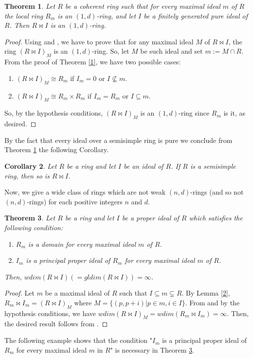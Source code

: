 \documentclass{amsart}
\newtheorem{theorem}{Theorem}[section]
\newtheorem{corollary}[theorem]{Corollary}
\theoremstyle{definition}
\theoremstyle{remark}
\theoremstyle{Definition and Notation}
\begin{document}
\begin{theorem}\label{20}Let $R$ be a coherent ring such that for every maximal ideal $m$ of $R$
the local ring $R_{m}$ is an $(1,d)$-ring, and let  $I$ be a
finitely generated pure ideal of $R$. Then $R\bowtie I$ is an
$(1,d)$-ring.
\end{theorem}
\begin{proof}
Using \cite[Theorem 3.2]{C} and \cite[Theorem 3.1]{CM}, we have to
prove that for any maximal ideal $M$ of $R\bowtie I$, the ring
$(R\bowtie I)_M$ is an $(1,d)$-ring. So, let $M$ be such ideal and
set $m:=M\cap R$. From the proof of Theorem \ref{1}, we have two
possible cases:

\begin{enumerate}
    \item $(R\bowtie I)_{M}\cong R_{m}$ if $I_m=0$ or $I\nsubseteq
    m$.
    \item $(R\bowtie I)_{M} \cong R_{m}\times R_m$ if $I_m=R_m$ or
    $I\subseteq m$.
\end{enumerate}
So, by the hypothesis conditions, $(R\bowtie I)_M$ is an
$(1,d)$-ring since $R_m$ is it, as desired.
\end{proof}
By the fact that every ideal over a semisimple ring is pure we
conclude from Theorem \ref{20} the following Corollary.
\begin{corollary}Let $R$ be a ring  and let  $I$ be an
ideal of $R$. If $R$ is a semisimple ring, then so is $R\bowtie
I$.
\end{corollary}
Now, we give a wide class of rings which are not weak
$(n,d)$-rings (and so not $(n,d)$-rings) for each positive
integers $n$ and $d$.
\begin{theorem}\label{17}Let $R$ be a  ring and let $I$ be a proper ideal of $R$ which satisfies the following condition:

\begin{enumerate}
    \item $R_{m}$ is a domain for
  every maximal ideal $m$ of $R$.
    \item $I_{m}$ is a principal proper ideal of
$R_{m}$ for every maximal ideal $m$ of $R$.
\end{enumerate}
Then, $wdim(R\bowtie I) (=gldim(R\bowtie I))=\infty$.
\end{theorem}
\begin{proof}
Let $m$ be a maximal ideal of $R$ such that $I\subseteq m
\varsubsetneq R$. By Lemma \ref{2}, $R_m\bowtie I_m= (R\bowtie
I)_M$ where $M=\{(p,p+i)|p\in m,i\in I\}$. From  \cite[Theorem
2.13]{CM} and by the hypothesis conditions, we have $wdim
(R\bowtie I)_{M}= wdim (R_{m}\bowtie I_{m})=\infty$. Then, the
desired result follows from \cite[Theorem 1.3.14]{G}.
\end{proof}
The following example shows that the condition "$I_{m}$ is a
principal proper ideal of $R_{m}$ for every maximal ideal $m$ in
$R$" is necessary in Theorem \ref{17}.
\end{document}
